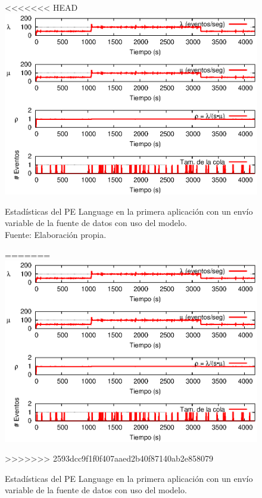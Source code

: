 \begin{figure}[!ht]
<<<<<<< HEAD
    \centering
    \captionsetup{justification=centering}
    \includegraphics[scale=1]{images/exp/app1/normal/cm/statusLanguagePE.eps}
    \caption[Estadísticas del PE Language en la primera aplicación con un envío variable de la fuente de datos con uso del modelo.]{Estadísticas del PE Language en la primera aplicación con un envío variable de la fuente de datos con uso del modelo.\\Fuente: Elaboración propia.}
=======
\centering
    \includegraphics[scale=1.1]{images/exp/app1/normal/cm/statusLanguagePE.eps}
    \caption{Estad\'isticas del PE Language en la primera aplicaci\'on con un env\'io variable de la fuente de datos con uso del modelo.}
>>>>>>> 2593dcc9f1f0f407aaed2b40f87140ab2e858079
    \label{fig:app1-normal-statusLanguagePE-cm}
\end{figure}

